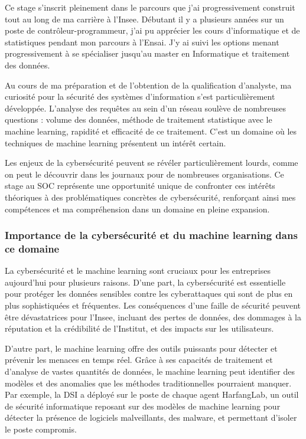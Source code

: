 \documentclass[
  letterpaper,
  DIV=11,
  numbers=noendperiod]{scrartcl}
\begin{document}
Ce stage s'inscrit pleinement dans le parcours que j'ai progressivement
construit tout au long de ma carrière à l'Insee. Débutant il y a
plusieurs années sur un poste de contrôleur-programmeur, j'ai pu
apprécier les cours d'informatique et de statistiques pendant mon
parcours à l'Ensai. J'y ai suivi les options menant progressivement à se
spécialiser jusqu'au master en Informatique et traitement des données.

Au cours de ma préparation et de l'obtention de la qualification
d'analyste, ma curiosité pour la sécurité des systèmes d'information
s'est particulièrement développée. L'analyse des requêtes au sein d'un
réseau soulève de nombreuses questions : volume des données, méthode de
traitement statistique avec le machine learning, rapidité et efficacité
de ce traitement. C'est un domaine où les techniques de machine learning
présentent un intérêt certain.

Les enjeux de la cybersécurité peuvent se révéler particulièrement
lourds, comme on peut le découvrir dans les journaux pour de nombreuses
organisations. Ce stage au SOC représente une opportunité unique de
confronter ces intérêts théoriques à des problématiques concrètes de
cybersécurité, renforçant ainsi mes compétences et ma compréhension dans
un domaine en pleine expansion.

\subsubsection{Importance de la cybersécurité et du machine learning
dans ce
domaine}\label{importance-de-la-cybersuxe9curituxe9-et-du-machine-learning-dans-ce-domaine}

La cybersécurité et le machine learning sont cruciaux pour les
entreprises aujourd'hui pour plusieurs raisons. D'une part, la
cybersécurité est essentielle pour protéger les données sensibles contre
les cyberattaques qui sont de plus en plus sophistiquées et fréquentes.
Les conséquences d'une faille de sécurité peuvent être dévastatrices
pour l'Insee, incluant des pertes de données, des dommages à la
réputation et la crédibilité de l'Institut, et des impacts sur les
utilisateurs.

D'autre part, le machine learning offre des outils puissants pour
détecter et prévenir les menaces en temps réel. Grâce à ses capacités de
traitement et d'analyse de vastes quantités de données, le machine
learning peut identifier des modèles et des anomalies que les méthodes
traditionnelles pourraient manquer. Par exemple, la DSI a déployé sur le
poste de chaque agent HarfangLab, un outil de sécurité informatique
reposant sur des modèles de machine learning pour détecter la présence
de logiciels malveillants, des malware, et permettant d'isoler le poste
compromis.
\end{document}
